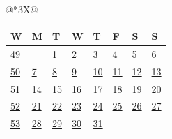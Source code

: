 \begin{tabularx}{\linewidth}{@{}*{3}{X}@{}}
{{\begin{tabularx}{\linewidth}{Y|*{7}{Y}}
  W & M & T & W & T & F & S & S \\ \hline
  \hyperlink{Week 49}{49} &&\hyperlink{Week 49}{1}&\hyperlink{Week 49}{2}&\hyperlink{Week 49}{3}&\hyperlink{Week 49}{4}&\hyperlink{Week 49}{\textcolor{gray!60!black}{5}}&\hyperlink{Week 49}{\textcolor{red!70!black}{6}}\\ 
  \hyperlink{Week 50}{50} &\hyperlink{Week 50}{7}&\hyperlink{Week 50}{8}&\hyperlink{Week 50}{9}&\hyperlink{Week 50}{10}&\hyperlink{Week 50}{11}&\hyperlink{Week 50}{\textcolor{gray!60!black}{12}}&\hyperlink{Week 50}{\textcolor{red!70!black}{13}}\\ 
  \hyperlink{Week 51}{51} &\hyperlink{Week 51}{14}&\hyperlink{Week 51}{15}&\hyperlink{Week 51}{16}&\hyperlink{Week 51}{17}&\hyperlink{Week 51}{18}&\hyperlink{Week 51}{\textcolor{gray!60!black}{19}}&\hyperlink{Week 51}{\textcolor{red!70!black}{20}}\\ 
  \hyperlink{Week 52}{52} &\hyperlink{Week 52}{21}&\hyperlink{Week 52}{22}&\hyperlink{Week 52}{23}&\hyperlink{Week 52}{24}&\hyperlink{Week 52}{25}&\hyperlink{Week 52}{\textcolor{gray!60!black}{26}}&\hyperlink{Week 52}{\textcolor{red!70!black}{27}}\\ 
  \hyperlink{Week 53}{53} &\hyperlink{Week 53}{28}&\hyperlink{Week 53}{29}&\hyperlink{Week 53}{30}&\hyperlink{Week 53}{31}&&&\\ 
  \end{tabularx}}
}
\end{tabularx}

